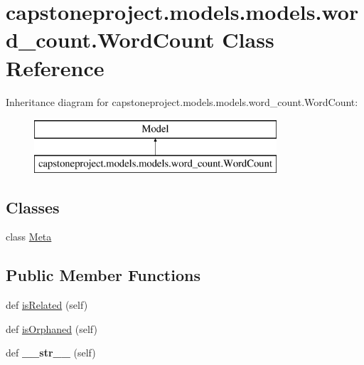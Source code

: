 \hypertarget{classcapstoneproject_1_1models_1_1models_1_1word__count_1_1_word_count}{}\section{capstoneproject.\+models.\+models.\+word\+\_\+count.\+Word\+Count Class Reference}
\label{classcapstoneproject_1_1models_1_1models_1_1word__count_1_1_word_count}
Inheritance diagram for capstoneproject.\+models.\+models.\+word\+\_\+count.\+Word\+Count\+:\begin{figure}[H]
\begin{center}
\leavevmode
\includegraphics[height=2.000000cm]{classcapstoneproject_1_1models_1_1models_1_1word__count_1_1_word_count}
\end{center}
\end{figure}
\subsection*{Classes}
\begin{DoxyCompactItemize}
\item 
class \mbox{\hyperlink{classcapstoneproject_1_1models_1_1models_1_1word__count_1_1_word_count_1_1_meta}{Meta}}
\end{DoxyCompactItemize}
\subsection*{Public Member Functions}
\begin{DoxyCompactItemize}
\item 
def \mbox{\hyperlink{classcapstoneproject_1_1models_1_1models_1_1word__count_1_1_word_count_abe18ee553574addf798e43a4a17d8344}{is\+Related}} (self)
\item 
def \mbox{\hyperlink{classcapstoneproject_1_1models_1_1models_1_1word__count_1_1_word_count_a3fee9d9f7d420f70b1b2d2e9fef5d0a7}{is\+Orphaned}} (self)
\item 
\mbox{\label{classcapstoneproject_1_1models_1_1models_1_1word__count_1_1_word_count_a24e6b243c8b49e89741a7977dcbb0a6e}} 
def {\bfseries \+\_\+\+\_\+str\+\_\+\+\_\+} (self)
\end{DoxyCompactItemize}
